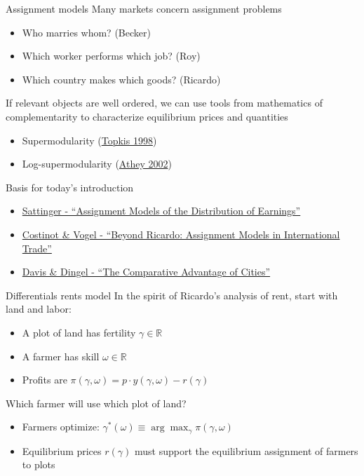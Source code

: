 \documentclass[10pt,notes=hide]{beamer}
\begin{document}
\begin{frame}{Assignment models}
Many markets concern assignment problems
\begin{itemize}
	\item Who marries whom? (Becker)
	\item Which worker performs which job? (Roy)
	\item Which country makes which goods? (Ricardo)
\end{itemize}
If relevant objects are well ordered, we can use tools from mathematics of complementarity to characterize equilibrium prices and quantities
\begin{itemize}
	\item Supermodularity (\href{http://press.princeton.edu/titles/6318.html}{Topkis 1998})
	\item Log-supermodularity (\href{http://qje.oxfordjournals.org/content/117/1/187.abstract}{Athey 2002})
\end{itemize}
Basis for today's introduction
\begin{itemize}
	\item \href{http://www.jstor.org/stable/2728516?}{Sattinger - ``Assignment Models of the Distribution of Earnings''} 
	\item \href{http://www.annualreviews.org/doi/abs/10.1146/annurev-economics-080213-041435}{Costinot \& Vogel - ``Beyond Ricardo: Assignment Models in International Trade''}
	\item \href{http://faculty.chicagobooth.edu/jonathan.dingel/research/index.html}{Davis \& Dingel - ``The Comparative Advantage of Cities''}
\end{itemize}
\end{frame}
\begin{frame}{Differentials rents model}
In the spirit of Ricardo's analysis of rent, start with land and labor:
\begin{itemize}
	\item A plot of land has fertility $\gamma \in\mathbb{R}$
	\item A farmer has skill $\omega \in\mathbb{R}$
	\item Profits are $\pi(\gamma,\omega) = p\cdot y(\gamma,\omega) - r(\gamma)$
\end{itemize}
Which farmer will use which plot of land?
\begin{itemize}
	\item Farmers optimize: $\gamma^{*}(\omega) \equiv \arg\max_{\gamma} \pi(\gamma,\omega)$
	\item Equilibrium prices $r(\gamma)$ must support the equilibrium assignment of farmers to plots
\end{itemize}
\end{frame}
\end{document}
